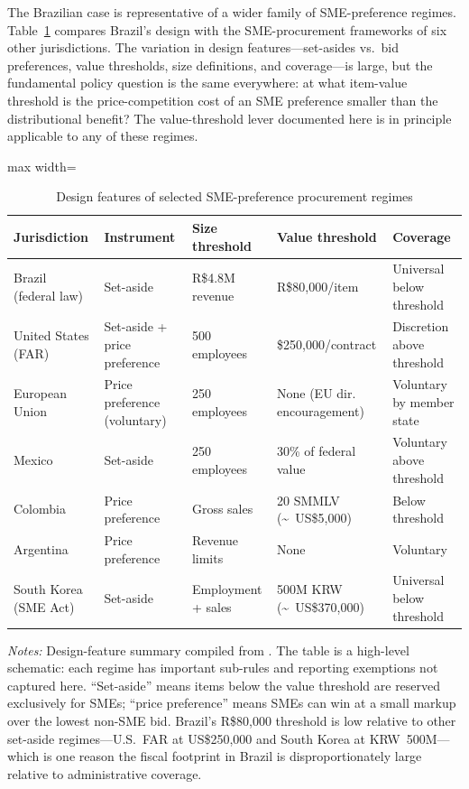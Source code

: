 The Brazilian case is representative of a wider family of SME-preference regimes. Table~\ref{tab:cross_country} compares Brazil's design with the SME-procurement frameworks of six other jurisdictions. The variation in design features---set-asides vs.\ bid preferences, value thresholds, size definitions, and coverage---is large, but the fundamental policy question is the same everywhere: at what item-value threshold is the price-competition cost of an SME preference smaller than the distributional benefit? The value-threshold lever documented here is in principle applicable to any of these regimes.

\begin{table}[htbp]
\centering
\caption{Design features of selected SME-preference procurement regimes}
\label{tab:cross_country}
\begin{adjustbox}{max width=\textwidth}
\begin{threeparttable}
\small
\begin{tabular}{lllll}
\toprule
Jurisdiction & Instrument & Size threshold & Value threshold & Coverage \\
\midrule
Brazil (federal law) & Set-aside   & R\$4.8M revenue     & R\$80{,}000/item   & Universal below threshold \\
United States (FAR)  & Set-aside + price preference & 500 employees & \$250{,}000/contract & Discretion above threshold \\
European Union       & Price preference (voluntary) & 250 employees & None (EU dir. encouragement) & Voluntary by member state \\
Mexico               & Set-aside   & 250 employees       & 30\% of federal value & Voluntary above threshold \\
Colombia             & Price preference & Gross sales     & 20 SMMLV (\textasciitilde~US\$5{,}000) & Below threshold \\
Argentina            & Price preference & Revenue limits  & None           & Voluntary \\
South Korea (SME Act)& Set-aside   & Employment + sales  & 500M KRW (\textasciitilde~US\$370{,}000) & Universal below threshold \\
\bottomrule
\end{tabular}
\begin{tablenotes}
\small
\item \textit{Notes:} Design-feature summary compiled from
\citet{oecd2018,sigma2016,hoekman2020,loader2013,loader2015,pwc2014,thai2017}.
The table is a high-level schematic: each regime has important sub-rules
and reporting exemptions not captured here. ``Set-aside'' means items
below the value threshold are reserved exclusively for SMEs; ``price
preference'' means SMEs can win at a small markup over the lowest
non-SME bid. Brazil's R\$80{,}000 threshold is low relative to other
set-aside regimes---U.S.\ FAR at US\$250{,}000 and South Korea at
KRW~500M---which is one reason the fiscal footprint in Brazil is
disproportionately large relative to administrative coverage.
\end{tablenotes}
\end{threeparttable}
\end{adjustbox}
\end{table}

